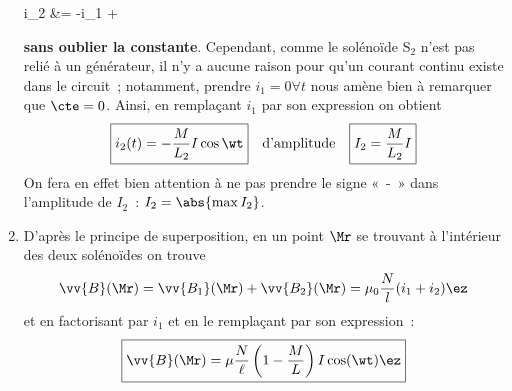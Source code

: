 \documentclass[a4paper, 10pt, final, garamond]{book}
\begin{document}
\begin{enumerate}
\begin{DispWithArrows*}
		      \Ra
		      i_2 &= -i_1 + \cte
	      \end{DispWithArrows*}
	      \textbf{sans oublier la constante}. Cependant, comme le solénoïde S$_2$
	      n'est pas relié à un générateur, il n'y a aucune raison pour qu'un
	      courant continu existe dans le circuit~; notamment, prendre $i_1 = 0
		      \forall t$ nous amène bien à remarquer que $\cte = 0$. Ainsi, en
	      remplaçant $i_1$ par son expression on obtient
	      \[
		      \boxed{i_2(t) = -\frac{M}{L_2}I\cos{\wt}}
		      \quad \text{d'amplitude} \quad
		      \boxed{I_2 = \frac{M}{L_2}I}
	      \]
	      On fera en effet bien attention à ne pas prendre le signe «~-~» dans
	      l'amplitude de $I_2$~: $I_2 = \abs{\max{I_2}}$.
	\item D'après le principe de superposition, en un point $\Mr$ se trouvant à
	      l'intérieur des deux solénoïdes on trouve
	      \[
		      \vv{B}(\Mr)
		      = \vv{B_1}(\Mr) + \vv{B_2}(\Mr)
		      = \mu_0 \frac{N}{l}(i_1+i_2) \ez
	      \]
	      et en factorisant par $i_1$ et en le remplaçant par son expression~:
	      \[
		      \boxed{
			      \vv{B}(\Mr) = \mu \frac{N}{\ell}
			      \left( 1 - \frac{M}{L} \right)I \cos(\wt)\ez
		      }
	      \]
\end{enumerate}
\end{document}
